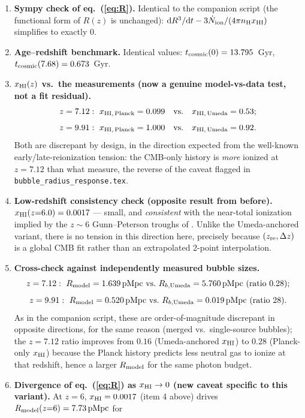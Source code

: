 \documentclass[11pt,a4paper]{article}
\newcommand{\Ndot}{\dot{N}_{\rm ion}}
\newcommand{\nH}{n_{\rm H}}
\newcommand{\pMpc}{\,{\rm pMpc}}
\begin{document}
\begin{enumerate}
\item \textbf{Sympy check of eq.~(\ref{eq:R}).} Identical to the companion script (the functional form of
      $R(z)$ is unchanged): $\mathrm{d}R^3/\mathrm{d}t-3\Ndot/(4\pi\nH x_{\rm HI})$ simplifies to exactly $0$.
\item \textbf{Age--redshift benchmark.} Identical values: $t_{\rm cosmic}(0)=13.795$~Gyr,
      $t_{\rm cosmic}(7.68)=0.673$~Gyr.
\item \textbf{$x_{\rm HI}(z)$ vs.\ the \citet{Umeda2023} measurements (now a genuine model-vs-data test,
      not a fit residual).}
      \[
        z=7.12:\ x_{\rm HI,\,Planck} = 0.099 \quad\text{vs.}\quad x_{\rm HI,\,Umeda} = 0.53;
      \]
      \[
        z=9.91:\ x_{\rm HI,\,Planck} = 1.000 \quad\text{vs.}\quad x_{\rm HI,\,Umeda} = 0.92.
      \]
      Both are discrepant by design, in the direction expected from the well-known early/late-reionization
      tension: the CMB-only history is \emph{more} ionized at $z=7.12$ than what \citet{Umeda2023} measure,
      the reverse of the caveat flagged in \texttt{bubble\_radius\_response.tex}.
\item \textbf{Low-redshift consistency check (opposite result from before).}
      $x_{\rm HI}(z{=}6.0)=0.0017$ — small, and \emph{consistent} with the near-total ionization implied by
      the $z\sim6$ Gunn--Peterson troughs of \citet{White2003}. Unlike the Umeda-anchored variant, there is
      no tension in this direction here, precisely because $(z_{\rm re},\Delta z)$ is a global CMB fit
      rather than an extrapolated 2-point interpolation.
\item \textbf{Cross-check against independently measured bubble sizes.}
      \[
        z=7.12:\ R_{\rm model}=1.639\pMpc \ \text{vs.}\ R_{b,\rm Umeda}=5.760\pMpc \ (\text{ratio } 0.28);
      \]
      \[
        z=9.91:\ R_{\rm model}=0.520\pMpc \ \text{vs.}\ R_{b,\rm Umeda}=0.019\pMpc \ (\text{ratio } 28).
      \]
      As in the companion script, these are order-of-magnitude discrepant in opposite directions, for the
      same reason (merged vs.\ single-source bubbles); the $z=7.12$ ratio improves from $0.16$ (Umeda-anchored
      $x_{\rm HI}$) to $0.28$ (Planck-only $x_{\rm HI}$) because the Planck history predicts less neutral gas
      to ionize at that redshift, hence a larger $R_{\rm model}$ for the same photon budget.
\item \textbf{Divergence of eq.~(\ref{eq:R}) as $x_{\rm HI}\to0$ (new caveat specific to this variant).}
      At $z=6$, $x_{\rm HI}=0.0017$ (item 4 above) drives $R_{\rm model}(z{=}6)=7.73\pMpc$ for

\end{enumerate}
\end{document}
